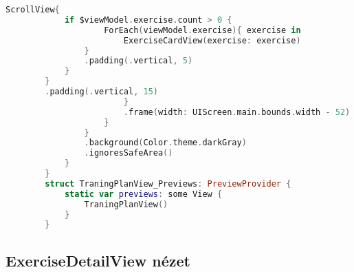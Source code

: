 \hspace{-10mm}
\begin{minipage}{\textwidth}
    \linespread{0.8}\selectfont
    \begin{lstlisting}[language=swift]
        ScrollView{
            if $viewModel.exercise.count > 0 {
                    ForEach(viewModel.exercise){ exercise in
                        ExerciseCardView(exercise: exercise)
                }
                .padding(.vertical, 5)
            }
        }
        .padding(.vertical, 15)
                        }
                        .frame(width: UIScreen.main.bounds.width - 52)
                    }
                }
                .background(Color.theme.darkGray)
                .ignoresSafeArea()
            }
        }
        struct TraningPlanView_Previews: PreviewProvider {
            static var previews: some View {
                TraningPlanView()
            }
        }  
    \end{lstlisting}   
\end{minipage}

\subsection*{ExerciseDetailView nézet}

